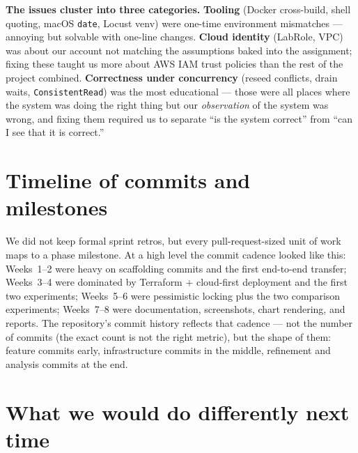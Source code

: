\documentclass[11pt,a4paper]{article}
\begin{document}
\begin{highlightbox}
\textbf{The issues cluster into three categories.} \textbf{Tooling} (Docker cross-build, shell quoting, macOS \texttt{date}, Locust venv) were one-time environment mismatches --- annoying but solvable with one-line changes. \textbf{Cloud identity} (LabRole, VPC) was about our account not matching the assumptions baked into the assignment; fixing these taught us more about AWS IAM trust policies than the rest of the project combined. \textbf{Correctness under concurrency} (reseed conflicts, drain waits, \texttt{ConsistentRead}) was the most educational --- those were all places where the system was doing the right thing but our \textit{observation} of the system was wrong, and fixing them required us to separate ``is the system correct'' from ``can I see that it is correct.''
\end{highlightbox}

\section{Timeline of commits and milestones}

We did not keep formal sprint retros, but every pull-request-sized unit of work maps to a phase milestone. At a high level the commit cadence looked like this: Weeks~1--2 were heavy on scaffolding commits and the first end-to-end transfer; Weeks~3--4 were dominated by Terraform + cloud-first deployment and the first two experiments; Weeks~5--6 were pessimistic locking plus the two comparison experiments; Weeks~7--8 were documentation, screenshots, chart rendering, and reports. The repository's commit history reflects that cadence --- not the number of commits (the exact count is not the right metric), but the shape of them: feature commits early, infrastructure commits in the middle, refinement and analysis commits at the end.

\section{What we would do differently next time}
\end{document}
